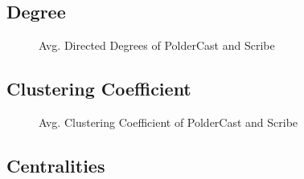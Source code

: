 \subsection{Degree}

%     

%     

\begin{figure}[H]
    \centering
    \caption{Avg. Directed Degrees of PolderCast and Scribe}
    \label{fig:eval_directedtdegree}
\end{figure}

\subsection{Clustering Coefficient}
\begin{figure}[H]
    \centering
    
    \caption{Avg. Clustering Coefficient of PolderCast and Scribe}
    \label{fig:eval_cc}
\end{figure}

\subsection{Centralities}

%     

%     

%     


